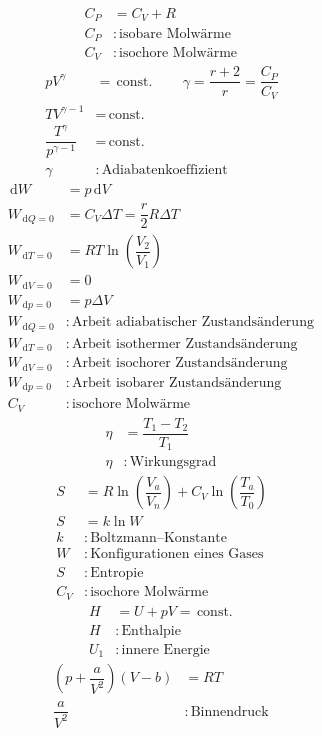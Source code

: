 \documentclass[a4paper,12pt]{article}
\newcommand{\td}{\,\text{d}}
\numberwithin{equation}{section}
\begin{document}
\begin{align} 
        C_P&=C_V+R\\
        C_P&:\,\text{isobare Molwärme}\,\nonumber \\
        C_V&:\,\text{isochore Molwärme}\,\nonumber 
\end{align} 
\begin{align} 
        pV^\gamma &=\,\text{const.}\,\qquad \gamma =\dfrac{r+2}{r}=\dfrac{C_P}{C_V}\\
        TV^{\gamma -1}&=\,\text{const.}\,\\
        \dfrac{T^\gamma }{p^{\gamma -1}}&=\,\text{const.}\,\\
        \gamma &:\,\text{Adiabatenkoeffizient}\,\nonumber 
\end{align} 
\begin{align} 
        \td W&=p\td V\\
        W_{\td Q=0}&=C_V\Delta T=\dfrac{r}{2}R\Delta T\\
        W_{\td T=0}&=RT\ln\left(\dfrac{V_2}{V_1}\right)\\
        W_{\td V=0}&=0\\
        W_{\td p=0}&=p\Delta V\\
        W_{\td Q=0}&:\,\text{Arbeit adiabatischer Zustandsänderung}\,\nonumber \\
        W_{\td T=0}&:\,\text{Arbeit isothermer Zustandsänderung}\,\nonumber \\
        W_{\td V=0}&:\,\text{Arbeit isochorer Zustandsänderung}\,\nonumber \\
        W_{\td p=0}&:\,\text{Arbeit isobarer Zustandsänderung}\,\nonumber \\
        C_V&:\,\text{isochore Molwärme}\,\nonumber 
\end{align} 
\begin{align} 
        \eta &=\dfrac{T_1-T_2}{T_1}\\
        \eta &:\,\text{Wirkungsgrad}\,\nonumber 
\end{align} 
\begin{align} 
        S&=R\ln\left(\dfrac{V_a}{V_n}\right)+C_V\ln\left(\dfrac{T_a}{T_0}\right)\\
        S&=k\ln W\\
        k&:\,\text{Boltzmann--Konstante}\,\nonumber \\
        W&:\,\text{Konfigurationen eines Gases}\,\nonumber \\
        S&:\,\text{Entropie}\,\nonumber \\
        C_V&:\,\text{isochore Molwärme}\,\nonumber 
\end{align} 
\begin{align} 
        H&=U+pV=\,\text{const.}\,\\
        H&:\,\text{Enthalpie}\,\nonumber \\
        U_1&:\,\text{innere Energie}\,\nonumber 
\end{align} 
\begin{align} 
        \left(p+\dfrac{a}{V^2}\right)\left(V-b\right)&=RT\\
        \dfrac{a}{V^2}&:\,\text{Binnendruck}\,\nonumber 
\end{align} 
\end{document}
